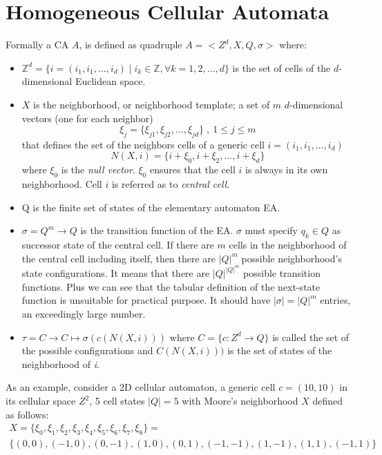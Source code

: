\section{Homogeneous Cellular Automata}\label{homogeneousCellularAutomata}
Formally a CA $A$, is defined as  quadruple $ A=<Z^d,X,Q,\sigma>$
where:
\begin{itemize}
  \item $\mathbb{Z}^d=\{i=(i_1,i_1,\ldots,i_d)\mid i_k \in
  \mathbb{Z}, \forall k=1,2,\ldots,d \}$ is the set of cells of the $d$-dimensional  Euclidean space.
  \item $X$ is the neighborhood, or neighborhood template; a
  set of $m$ $d$-dimensional vectors (one for each neighbor)
  \[\xi_j=\{\xi_{j1},\xi_{j2},\ldots,\xi_{jd}\} \;,\: 1\leq j \leq m\] that
  defines the set of the neighbors cells of a generic cell
  $i=(i_1,i_1,\ldots,i_d)$
  \[
  N(X,i)=\{i+\xi_0,i+\xi_2,\ldots,i+\xi_d\}
  \] where $\xi_0$ is the \textit{null vector}. $\xi_0$ ensures that the
  cell $i$ is always in its own neighborhood.  Cell $i$ is referred as to \emph{central cell}.

\item Q is the finite set of states of the elementary automaton EA.
  
  \item $\sigma=Q^m \rightarrow Q $ is the transition
  function of the EA. $\sigma$ must specify
  $q_k \in Q $ as successor  state of the central cell.
  If there are $m$ cells in the neighborhood of the central
  cell including itself, then there are
  ${\left\vert{Q}\right\vert}^m$ possible neighborhood's
  state configurations. It  means that there are
  ${\left\vert{Q}\right\vert}^{{\left\vert{Q}\right\vert}^m}$
  possible transition functions. Plus we can see that the tabular definition of
  the next-state function is unsuitable for practical purpose. It should have
  $\left\vert{\sigma}\right\vert={\left\vert{Q}\right\vert}^m$
  entries, an exceedingly large number.
  \item $\tau=C \longrightarrow C \longmapsto
  \sigma(c(N(X,i))) $ where $C=\{c \colon Z^d
  \rightarrow Q\}$
  is called the set of the possible configurations and 
  $
  C(N(X,i)))$ is the set of states of the neighborhood of \textit{i}.
\end{itemize}
As an example, consider a $2$D cellular automaton, a
generic cell $c=(10,10)$ in its cellular space $Z^2$, 5 cell states  ${\left\vert{Q}\right\vert}=5$ with Moore's neighborhood  $X$ defined as follows:
\begin{gather*}
X=\{\xi_{0},\xi_{1},\xi_{2},\xi_{3},\xi_{4},\xi_{5},\xi_{6},\xi_{7},\xi_{8}\}
=\\ \{(0,0),(-1,0),(0,-1),(1,0),(0,1),(-1,-1),(1,-1),(1,1),(-1,1)\}
\end{gather*}
